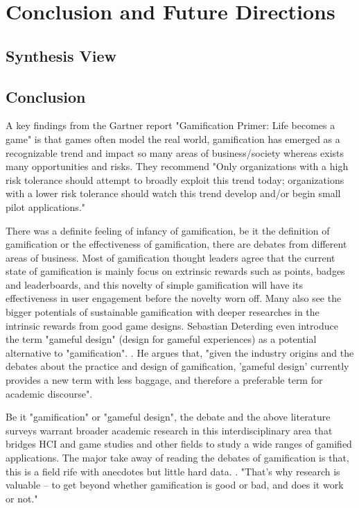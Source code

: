\chapter{Conclusion and Future Directions}

\section {Synthesis View}

\section {Conclusion}

A key findings from the Gartner report "Gamification Primer: Life becomes a game" \cite {gartner2010} is that games often model the real world, gamification has emerged as a recognizable trend and impact so many areas of business/society whereas exists many opportunities and risks. They recommend "Only organizations with a high risk tolerance should attempt to broadly exploit this trend today; organizations with a lower risk tolerance should watch this trend develop and/or begin small pilot applications."

There was a definite feeling of infancy of gamification, be it the definition of gamification or the effectiveness of gamification, there are debates from different areas of business.  Most of gamification thought leaders agree that the current state of gamification is mainly focus on extrinsic rewards such as points, badges and leaderboards,  and this novelty of simple gamification will have its effectiveness in user engagement before the novelty worn off. Many also see the bigger potentials of sustainable gamification with deeper researches in the intrinsic rewards from good game designs. Sebastian Deterding even introduce the term "gameful design" (design  for  gameful  experiences)  as  a  potential  alternative  to  "gamification". \cite {Deterding2011mt}. He argues that,  "given the industry origins and the debates about the practice and design of gamification, 'gameful design' currently provides a new term with less baggage, and therefore a preferable term for academic discourse".

Be it "gamification" or "gameful design", the debate and the above literature surveys warrant broader academic research in this interdisciplinary area that bridges HCI and game studies and other fields to study a wide ranges of gamified applications. The major take away of reading the debates of gamification is that, this is a field rife with anecdotes but little hard data. \cite {Wharton2011}.  "That's why research is valuable -- to get beyond whether gamification is good or bad, and does it work or not." 

